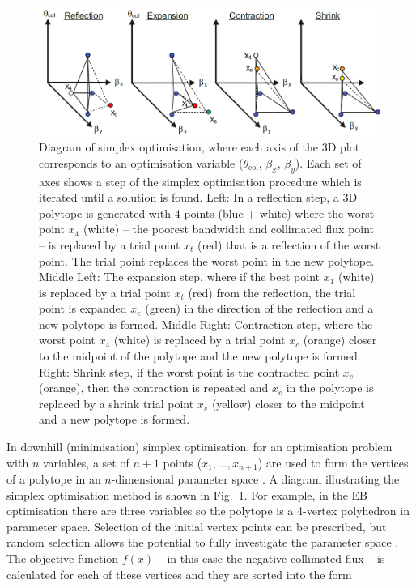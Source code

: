 \documentclass[../main.tex]{subfiles}
\begin{document}
\begin{figure}[!h]
\centering
\includegraphics[width=\textwidth]{Figures/Optimisation_and_Characterisation_of_Inverse_Compton_Scattering_Sources/simplex_fixed_4.pdf}
\caption{Diagram of simplex optimisation, where each axis of the 3D plot corresponds to an optimisation variable ($\theta_{\mathrm{col}}$, $\beta_{x}$, $\beta_{y}$). Each set of axes shows a step of the simplex optimisation procedure which is iterated until a solution is found. Left: In a reflection step, a 3D polytope is generated with 4 points (blue + white) where the worst point $x_{4}$ (white) -- the poorest bandwidth and collimated flux point -- is replaced by a trial point $x_{t}$ (red) that is a reflection of the worst point. The trial point replaces the worst point in the new polytope. Middle Left: The expansion step, where if the best point $x_{1}$ (white) is replaced by a trial point $x_{t}$ (red) from the reflection, the trial point is expanded $x_{e}$ (green) in the direction of the reflection and a new polytope is formed. Middle Right: Contraction step, where the worst point $x_{4}$ (white) is replaced by a trial point $x_{c}$ (orange) closer to the midpoint of the polytope and the new polytope is formed. Right: Shrink step, if the worst point is the contracted point $x_{c}$ (orange), then the contraction is repeated and $x_{c}$ in the polytope is replaced by a shrink trial point $x_{s}$ (yellow) closer to the midpoint and a new polytope is formed. }
\label{fig:simplex_method_diagram}
\end{figure}
In downhill (minimisation) simplex optimisation, for an optimisation problem with $n$ variables, a set of $n+1$ points ($x_{1}, \ldots, x_{n+1}$) are used to form the vertices of a polytope in an $n$-dimensional parameter space \cite{wolfram2021nmaximize}. A diagram illustrating the simplex optimisation method is shown in Fig.~\ref{fig:simplex_method_diagram}. For example, in the EB optimisation there are three variables so the polytope is a 4-vertex polyhedron in parameter space. Selection of the initial vertex points can be prescribed, but random selection allows the potential to fully investigate the parameter space \cite{koshel2002enhancement}. The objective function $f\left(x\right)$ -- in this case the negative collimated flux -- is calculated for each of these vertices and they are sorted into the form
\end{document}
